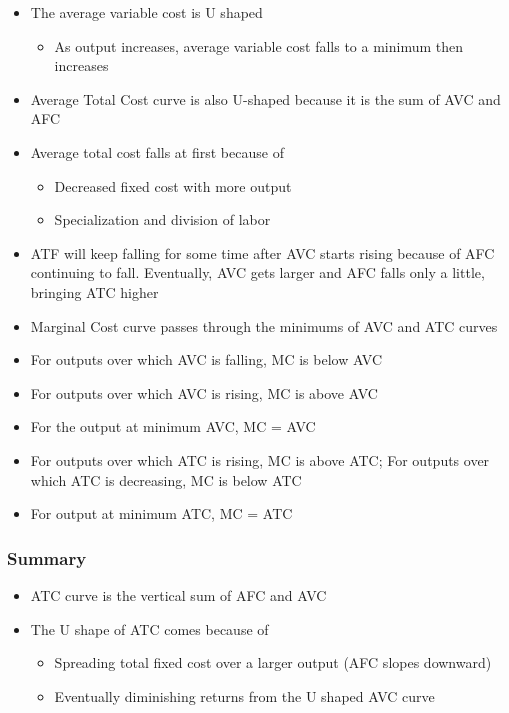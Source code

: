 \documentclass[11pt]{article}
\begin{document}
\begin{itemize}
\item The average variable cost is U shaped
\begin{itemize}
\item As output increases, average variable cost falls to a minimum then increases
\end{itemize}
\item Average Total Cost curve is also U-shaped because it is the sum of AVC and AFC
\item Average total cost falls at first because of
\begin{itemize}
\item Decreased fixed cost with more output
\item Specialization and division of labor
\end{itemize}
\item ATF will keep falling for some time after AVC starts rising because of AFC continuing to fall. Eventually, AVC gets larger and AFC falls only a little, bringing ATC higher
\item Marginal Cost curve passes through the minimums of AVC and ATC curves
\item For outputs over which AVC is falling, MC is below AVC
\item For outputs over which AVC is rising, MC is above AVC
\item For the output at minimum AVC, MC = AVC
\item For outputs over which ATC is rising, MC is above ATC; For outputs over which ATC is decreasing, MC is below ATC
\item For output at minimum ATC, MC = ATC
\end{itemize}
\subsubsection{Summary}
\label{sec:org8289903}
\begin{itemize}
\item ATC curve is the vertical sum of AFC and AVC
\item The U shape of ATC comes because of
\begin{itemize}
\item Spreading total fixed cost over a larger output (AFC slopes downward)
\item Eventually diminishing returns from the U shaped AVC curve
\end{itemize}
\end{itemize}
\end{document}
